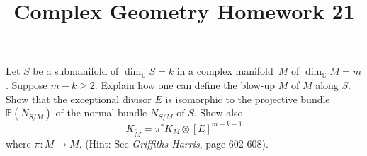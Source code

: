 \documentclass[12pt]{article}
\title{Complex Geometry Homework 21}
\author{}
\date{}
\begin{document}
\maketitle
\begin{problem}
  Let \(S\) be a submanifold of \(\dim_{\mathbb{C}}S=k\) in a complex manifold\
  \(M\) of \(\dim_{\mathbb{C}}M=m\). Suppose \(m-k\ge 2\). Explain how one can
  define the blow-up \(\tilde{M}\) of \(M\) along \(S\). Show that the
  exceptional divisor \(E\) is isomorphic to the projective bundle \(\mathbb{P}
  (N_{S/M})\) of the normal bundle \(N_{S/M}\) of \(S\). Show also \[
    K_{\tilde{M}}=\pi^* K_M\otimes [E]^{m-k-1}
  \] where \(\pi\colon \tilde{M}\to M\). (Hint: See \emph{Griffiths-Harris},
  page 602-608).
\end{problem}
\end{document}

